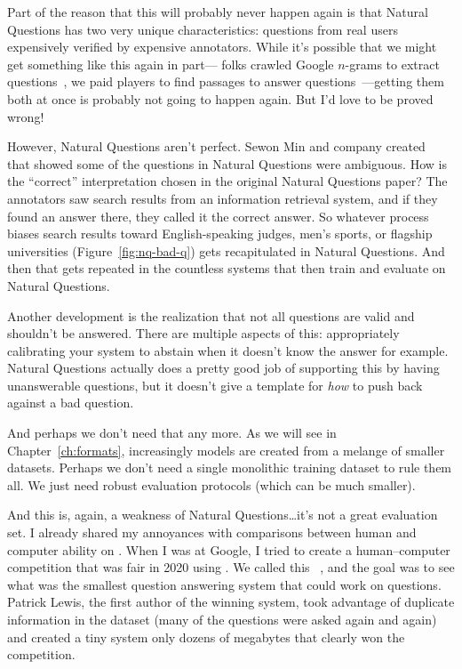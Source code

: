 Part of the reason that this will probably never happen again is that Natural Questions has two very unique characteristics: questions from real users expensively verified by expensive annotators.  
%
While it’s possible that we might get something like this again in part--- folks crawled Google $n$-grams to extract questions~\citep{lee-19}, we paid \quizbowl{} players to find passages to answer questions~\citep{Guha-15}---getting them both at once is probably not going to happen again.
%
But I’d love to be proved wrong! 

However, Natural Questions aren’t perfect.  
%
Sewon Min and company created \ambigqa{}~\citep{min-20-ambigqa} that showed
some of the questions in Natural Questions were ambiguous.
%
How is the ``correct'' interpretation chosen in the original Natural
Questions paper?
%
The annotators saw search results from an information retrieval
system, and if they found an answer there, they called it the correct
answer.
%
So whatever process biases search results toward English-speaking
judges, men’s sports, or flagship universities
(Figure~\ref{fig:nq-bad-q}) gets recapitulated in Natural Questions.
%
And then that gets repeated in the countless  systems that
then train and evaluate on Natural Questions.

Another development is the realization that not all questions are valid and shouldn’t be answered.  
%
There are multiple aspects of this: appropriately calibrating your  system to abstain when it doesn’t know the answer for example.
%
Natural Questions actually does a pretty good job of supporting this by having unanswerable questions, but it doesn't give a template for \emph{how} to push back against a bad question.

And perhaps we don’t need that any more.
%
As we will see in Chapter~\ref{ch:formats}, increasingly  models are created from a melange of smaller datasets.
%
Perhaps we don’t need a single monolithic  training dataset to rule them all.  
%
We just need robust evaluation protocols (which can be much smaller). 

And this is, again, a weakness of Natural Questions\dots it’s not a great evaluation set. 
%
I already shared my annoyances with comparisons between human and computer ability on \squad{}.
%
When I was at Google, I tried to create a human--computer competition that was fair in 2020 using .
%
%
We called this ~\citep{min2021efficientqa}, and the goal was to see what
was the smallest question answering system that could work on 
questions.
%
Patrick Lewis, the first author of the winning system, took advantage
of duplicate information in the dataset (many of the questions were
asked again and again) and created a tiny system only dozens of
megabytes that clearly won the competition.

